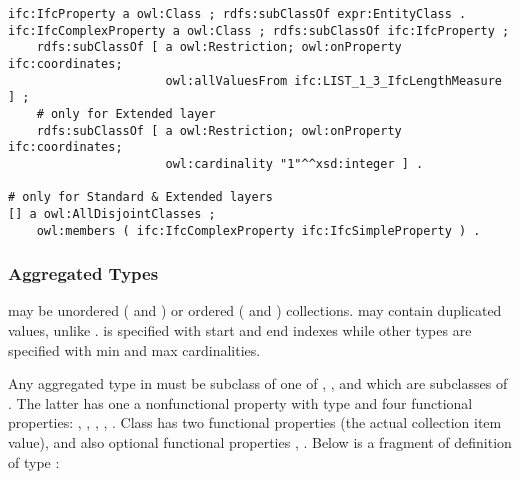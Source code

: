 \begin{lstlisting}
ifc:IfcProperty a owl:Class ; rdfs:subClassOf expr:EntityClass .
ifc:IfcComplexProperty a owl:Class ; rdfs:subClassOf ifc:IfcProperty ;
    rdfs:subClassOf [ a owl:Restriction; owl:onProperty ifc:coordinates;
                      owl:allValuesFrom ifc:LIST_1_3_IfcLengthMeasure ] ;
    # only for Extended layer
    rdfs:subClassOf [ a owl:Restriction; owl:onProperty ifc:coordinates;
                      owl:cardinality "1"^^xsd:integer ] .

# only for Standard & Extended layers
[] a owl:AllDisjointClasses ;
    owl:members ( ifc:IfcComplexProperty ifc:IfcSimpleProperty ) .
\end{lstlisting}


\subsubsection{Aggregated Types} may be unordered ( and ) or  ordered ( and ) collections.  may contain duplicated values, unlike .  is specified with start and end indexes while other types are specified with min and max cardinalities.

Any aggregated type in \ifcowl{} must be subclass of one of , ,  and  which are subclasses of . The latter has one a nonfunctional property  with type  and four functional properties: , , , , . Class  has two functional properties  (the actual collection item value),  and also optional functional properties , . Below is a fragment of definition of type :


